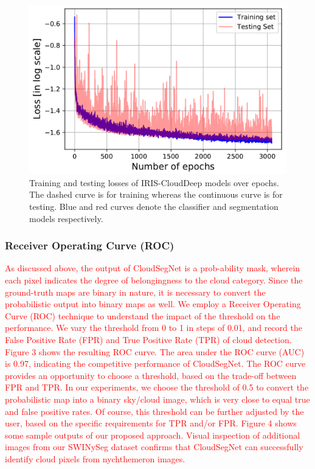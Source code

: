 \documentclass[amt, article]{copernicus}
\begin{document}
\begin{figure}[t]
	\includegraphics[width=\hsize]{figures/loss_trend.png}
	\caption{Training and testing losses of IRIS-CloudDeep models over
    epochs. The dashed curve is for training whereas the continuous curve is for testing. Blue and red curves denote the classifier and segmentation models respectively.}
    \label{fig:loss_trend}
\end{figure}

\subsubsection{Receiver Operating Curve (ROC)}

\textcolor{red}{As discussed above, the output of CloudSegNet is a prob-ability mask, wherein each pixel indicates the degree of belongingness to the cloud category. Since the ground-truth maps are binary in nature, it is necessary to convert the probabilistic output into binary maps as well. We employ a Receiver Operating Curve (ROC) technique to understand the impact of the threshold on the performance. We vary the threshold from 0 to 1 in steps of 0.01, and record the False Positive Rate (FPR) and True Positive Rate (TPR) of cloud detection. Figure 3 shows the resulting ROC curve. The area under the ROC curve (AUC) is 0.97, indicating the competitive performance of CloudSegNet. The ROC curve provides an opportunity to choose a threshold, based on the trade-off between FPR and TPR. In our experiments, we choose the threshold of 0.5 to convert the probabilistic map into a binary sky/cloud image, which is very close to equal true and false positive rates. Of course, this threshold can be further adjusted by the user, based on the specific requirements for TPR and/or FPR. Figure 4 shows some sample outputs of our proposed approach. Visual inspection of additional images from our SWINySeg dataset confirms that CloudSegNet can successfully identify cloud pixels from nychthemeron images.}
\end{document}
